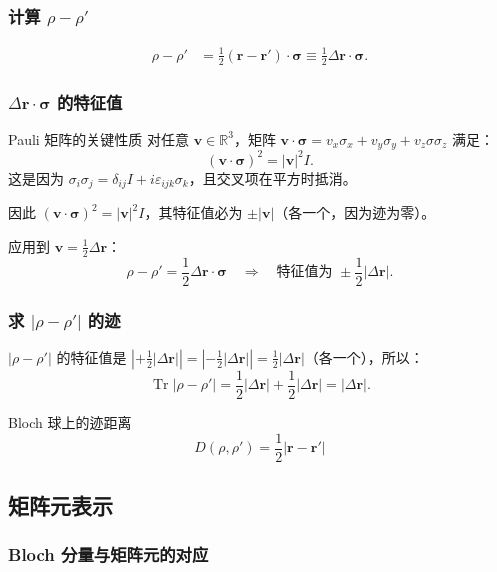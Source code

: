 \subsubsection{计算 $\rho-\rho'$}

\begin{align*}
  \rho - \rho' &= \frac12(\bm r - \bm r')\cdot\bm\sigma
  \equiv \frac12 \Delta\bm r \cdot\bm\sigma.
\end{align*}

\subsubsection{$\Delta\bm r\cdot\bm\sigma$ 的特征值}

\begin{derivationbox}{Pauli 矩阵的关键性质}
对任意 $\bm v\in\mathbb{R}^3$，矩阵 $\bm v\cdot\bm\sigma = v_x\sigma_x + v_y\sigma_y + v_z\sigma\sigma_z$ 满足：
\[
  (\bm v\cdot\bm\sigma)^2 = |\bm v|^2 I.
\]
这是因为 $\sigma_i\sigma_j = \delta_{ij}I + i\varepsilon_{ijk}\sigma_k$，且交叉项在平方时抵消。

因此 $(\bm v\cdot\bm\sigma)^2 = |\bm v|^2 I$，其特征值必为 $\pm|\bm v|$（各一个，因为迹为零）。
\end{derivationbox}

应用到 $\bm v = \frac12\Delta\bm r$：
\[
  \rho-\rho' = \frac12\Delta\bm r\cdot\bm\sigma
  \quad\Longrightarrow\quad
  \text{特征值为 } \pm\frac12|\Delta\bm r|.
\]

\subsubsection{求 $|\rho-\rho'|$ 的迹}

$|\rho-\rho'|$ 的特征值是 $|{+\frac12|\Delta\bm r|}| = |{-\frac12|\Delta\bm r|}| = \frac12|\Delta\bm r|$（各一个），所以：
\[
  \operatorname{Tr}|\rho-\rho'| = \frac12|\Delta\bm r| + \frac12|\Delta\bm r| = |\Delta\bm r|.
\]

\begin{formulabox}{Bloch 球上的迹距离}
\[
  \boxed{D(\rho,\rho') = \frac12|\bm r - \bm r'|}
\]
\end{formulabox}


\subsection{矩阵元表示}

\subsubsection{Bloch 分量与矩阵元的对应}

